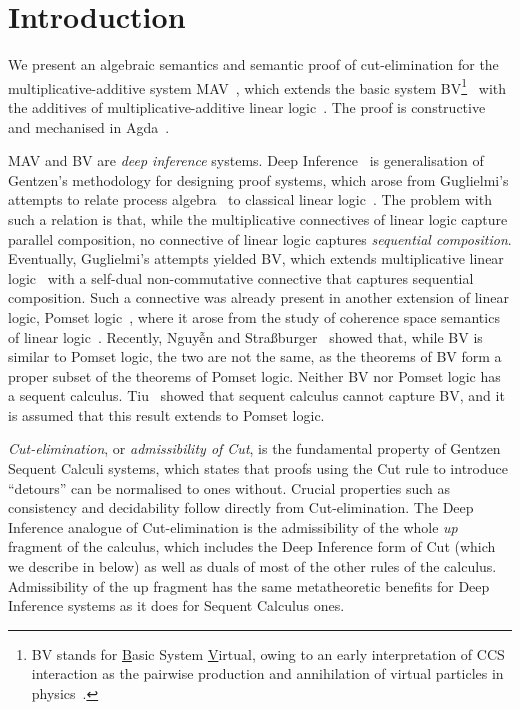 \section{Introduction}\label{sec:introduction}

We present an algebraic semantics and semantic proof of cut-elimination for the multiplicative-additive system MAV~\cite{Horne15:mav}, which extends the basic system BV\footnote{
      BV stands for \underline{B}asic System \underline{V}irtual, owing to an early interpretation of CCS interaction as the pairwise production and annihilation of virtual particles in physics~\cite[]{Horne15:mav}.
}~\cite{Guglielmi99:bv,Guglielmi07:sis} with the additives of multiplicative-additive linear logic~\cite[MALL]{Girard87:ll}.
The proof is constructive and mechanised in Agda~\cite{Agda264}.

MAV and BV are \emph{deep inference} systems. Deep Inference~\cite{Guglielmi14:di} is generalisation of Gentzen's methodology for designing proof systems, which arose from Guglielmi's attempts to relate process algebra~\cite[CCS]{Milner80:CCS,Milner89:CC} to classical linear logic~\cite[CLL]{Girard87:ll}.
The problem with such a relation is that, while the multiplicative connectives of linear logic capture parallel composition, no connective of linear logic captures \emph{sequential composition}.
Eventually, Guglielmi's attempts yielded BV, which extends multiplicative linear logic~\cite[MLL]{Girard87:ll} with a self-dual non-commutative connective that captures sequential composition.
Such a connective was already present in another extension of linear logic, Pomset logic~\cite{Retore97:pomset}, where it arose from the study of coherence space semantics of linear logic~\cite[]{GirardTL89:proofs}.
Recently, Nguyễn and Stra{\ss}burger~\cite{NguyenS22:bvisnotpl} showed that, while BV is similar to Pomset logic, the two are not the same, as the theorems of BV form a proper subset of the theorems of Pomset logic.
Neither BV nor Pomset logic has a sequent calculus. Tiu~\cite{Tiu06:sisii} showed that sequent calculus cannot capture BV, and it is assumed that this result extends to Pomset logic.

\emph{Cut-elimination}, or \emph{admissibility of Cut}, is the fundamental property of Gentzen Sequent Calculi systems, which states that proofs using the Cut rule to introduce ``detours'' can be normalised to ones without. Crucial properties such as consistency and decidability follow directly from Cut-elimination. The Deep Inference analogue of Cut-elimination is the admissibility of the whole \emph{up} fragment of the calculus, which includes the Deep Inference form of Cut (which we describe in  below) as well as duals of most of the other rules of the calculus. Admissibility of the up fragment has the same metatheoretic benefits for Deep Inference systems as it does for Sequent Calculus ones.

